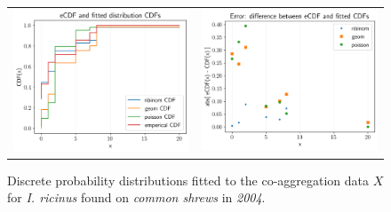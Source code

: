 \documentclass[hidelinks]{article}
\begin{document}
\begin{figure}[]
	\begin{mdframed}[backgroundcolor=grey250,rightline=false,leftline=false,topline=false]
	\centering
	\begin{tabular}{ll}
		\includegraphics[width=.48\linewidth,valign=m]{CDF_compare_2004_I.ricinus_SA} & \includegraphics[width=.48\linewidth,valign=m]{CDF_errors_2004_I.ricinus_SA}
	\end{tabular}
	\caption{Discrete probability distributions fitted to the co-aggregation data $ X $ for \textit{I. ricinus} found on \textit{common shrews} in \textit{2004}.}
	\label{fig:CDF_2004_iricinus_SA}
	\end{mdframed}
\end{figure}
\end{document}
